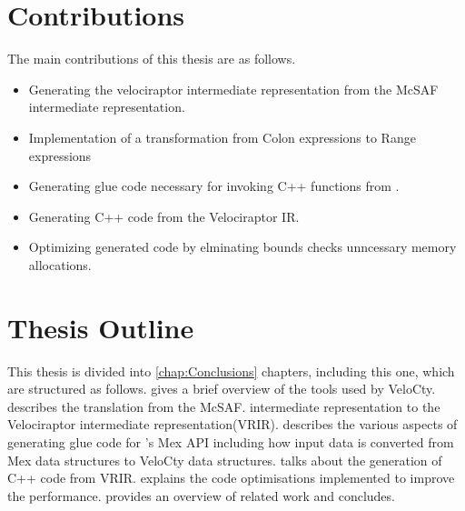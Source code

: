 \section{Contributions}
The main contributions of this thesis are as follows.
\begin{itemize}
\item Generating the velociraptor intermediate representation from the McSAF intermediate representation. 
\item Implementation of a transformation from  Colon expressions to Range expressions
\item Generating glue code necessary for invoking C++ functions from \matlab.
\item Generating C++ code from the Velociraptor IR.
\item Optimizing generated code by elminating bounds checks unncessary memory allocations. 
\end{itemize}
\section{Thesis Outline}
This thesis is divided into \ref{chap:Conclusions} chapters, including this one, which are structured as follows.
 gives a brief overview of the tools
used by VeloCty.
 describes the translation from the McSAF.
intermediate representation to the Velociraptor intermediate representation(VRIR).
 describes the various aspects of generating glue code for \matlab's Mex API including how input data is converted from Mex data structures to VeloCty data structures. 
 talks about the generation of C++ code from VRIR.
 explains the code optimisations implemented to improve the performance. 
 provides an overview of related work and
 concludes.
